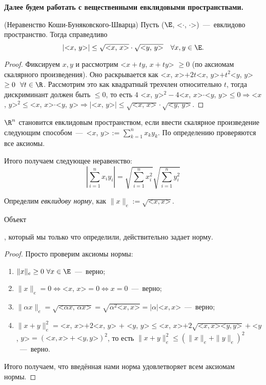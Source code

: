 \textbf{Далее будем работать с вещественными евклидовыми пространствами.}
\begin{theorem}
    (Неравенство Коши-Буняковского-Шварца) Пусть ($\E$, <$\cdot$, $\cdot$>)~---~евклидово пространство. Тогда справедливо
    $$ |\text{<}x\text{, }y\text{>}| \leq \sqrt{\text{<}x\text{, }x\text{>}} \cdot \sqrt{\text{<}y\text{, }y\text{>}} \quad \forall x, y \in \E.$$
\end{theorem}
\begin{proof}
    Фиксируем $x, y$ и рассмотрим <$x + ty$, $x + ty$> $\geq 0$ (по аксиомам скалярного произведения). Оно раскрывается как <$x$, $x$>$ + 2t$<$x$, $y$>$ + t^2$<$y$, $y$>$ \geq 0 \ \ \forall t \in \R$. Рассмотрим это как квадратный трехчлен относительно $t$, тогда дискриминант должен быть $\leq 0$, то есть $4$ <$x$, $y\text{>}^2 - 4$<$x$, $x$>$\cdot$<$y$, $y$>$\leq 0 \Rightarrow$<$x$, $y\text{>}^2 \leq $<$x$, $x$>$\cdot$<$y$, $y$>$\Rightarrow  |\text{<}x\text{, }y\text{>}| \leq \sqrt{\text{<}x\text{, }x\text{>}} \cdot \sqrt{\text{<}y\text{, }y\text{>}}$.
\end{proof}
\begin{example}
    $\R^n$ становится евклидовым пространством, если ввести скалярное произведение следующим способом~---~<$x$, $y$> := $\displaystyle \sum_{k = 1}^{n} x_{k} y_{k}$. По определению проверяются все аксиомы.
\end{example}
Итого получаем следующее неравенство:
$$ \left|\sum_{i = 1}^{n} x_{i} y_{i}\right| = \sqrt{\sum_{i = 1}^{n} x_{i}^2} \sqrt{\sum_{i = 1}^{n} y_{i}^2}$$
\begin{definition}
    \hypertarget{def7.16}{Определим \textit{евклидову норму}, как $\|x\|_{e} := \sqrt{\text{<}x, x\text{>}}$.}
\end{definition}
\begin{theorem}
    \hypertarget{def7.16}{Объект}, который мы только что определили, действительно задает норму.
\end{theorem}
\begin{proof}
    Просто проверим аксиомы нормы:
    \begin{enumerate}
        \item $\|x\|_{e} \geq 0 \ \forall x \in \E$~---~верно;
        \item $\|x\|_{e} = 0 \Leftrightarrow$<$x$, $x$>$= 0 \Leftrightarrow x = 0$~---~верно;
        \item $\|\alpha x\|_{e} = \sqrt{\text{<}\alpha x\text{, }\alpha x\text{>}} = \sqrt{\alpha^2 \text{<}x, x\text{>}} = |\alpha|\text{<}x, x\text{>}$~---~верно;
        \item $\|x + y\|_{e}^2 =$<$x$, $x$>$ + 2$<$x$, $y$> + <$y$, $y$>$ \leq$<$x$, $x$>$ + 2 \sqrt{\text{<}x, x\text{><}y, y\text{>}} + $<$y$, $y$>$ = \left( \text{<}x, x\text{>} + \text{<}y, y\text{>}\right)^2$, то есть $\|x + y\|_{e}^2 \leq \left( \|x\|_{e} + \|y\|_{e}\right)^2$~---~верно.
    \end{enumerate}
    Итого получаем, что введённая нами норма удовлетворяет всем аксиомам нормы.
\end{proof}
